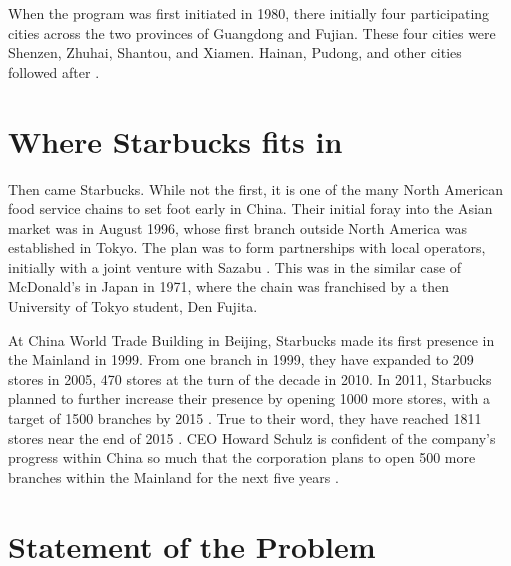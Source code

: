 When the program was first initiated in 1980, there initially four participating
cities across the two provinces of Guangdong and Fujian. These four cities were
Shenzen, Zhuhai, Shantou, and Xiamen. Hainan, Pudong, and other cities followed
after \autocite{jaggi_chinas_1996}. 


\section{Where Starbucks fits in}

Then came Starbucks. While not the first, it is one of the many North American
food service chains to set foot early in China. Their initial foray into the Asian
market was in August 1996, whose first branch outside North America was
established in Tokyo. The plan was to form partnerships with local operators,
initially with a joint venture with Sazabu \autocite{harrison_exporting_2005}.
This was in the similar case of McDonald's in Japan in 1971, where the chain was
franchised by a then University of Tokyo student, Den Fujita.
\autocite[21, 113]{watson_golden_2006}

At China World Trade Building in Beijing, Starbucks made its first presence in
the Mainland in 1999. From one branch in 1999, they have expanded to 209 stores
in 2005, 470 stores at the turn of the decade in 2010. In 2011, Starbucks
planned to further increase their presence by opening 1000 more stores, with a
target of 1500 branches by 2015 \autocite{_starbucks_2011}. True to their word,
they have reached 1811 stores near the end of 2015
\autocite{statista_starbucks_2015}. CEO Howard Schulz is confident of the
company's progress within China so much that the corporation plans to open 500
more branches within the Mainland for the next five years
\autocite{burkitt_starbucks_2016}.





\section{Statement of the Problem}

